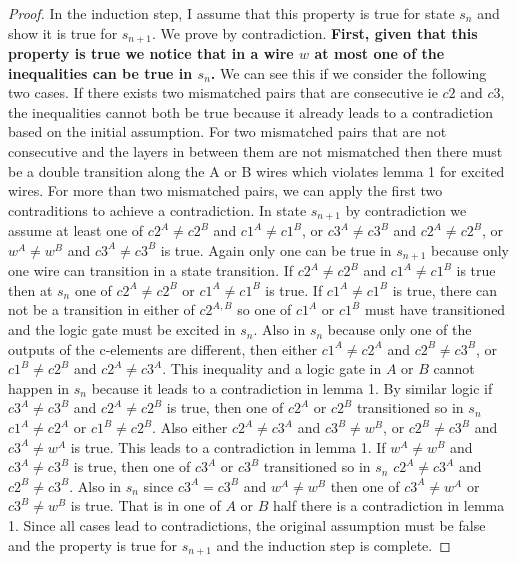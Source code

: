 \documentclass{article}
\begin{document}
\begin{proof}
In the induction step, I assume that this property is true for state $s_n$ and show it is true for $s_{n+1}$.  \newline
We prove by contradiction.  \textbf{First, given that this property is true we notice that in a wire $w$ at most one of the inequalities can be true in $s_n$.} We can see this if we consider the following two cases. If there exists two mismatched pairs that are consecutive ie $c2$ and $c3$, the inequalities cannot both be true because it already leads to a contradiction based on the initial assumption.  For two mismatched pairs that are not consecutive and the layers in between them are not mismatched then there must be a double transition along the A or B wires which violates lemma 1 for excited wires.  For more than two mismatched pairs, we can apply the first two contraditions to achieve a contradiction.\newline
In state $s_{n+1}$ by contradiction we assume at least one of $c2^A\neq c2^B$ and $c1^A\neq c1^B$, or $c3^A\neq c3^B$ and $c2^A\neq c2^B$, or $w^A\neq w^B$ and $c3^A\neq c3^B$ is true.  Again only one can be true in $s_{n+1}$ because only one wire can transition in a state transition.  If $c2^A\neq c2^B$ and $c1^A\neq c1^B$ is true then at $s_n$ one of $c2^A\neq c2^B$ or $c1^A\neq c1^B$ is true. If $c1^A\neq c1^B$ is true, there can not be a transition in either of $c2^{A,B}$ so one of $c1^A$ or $c1^B$ must have transitioned and the logic gate must be excited in $s_n$.  Also in $s_n$ because only one of the outputs of the c-elements are different, then either $c1^A\neq c2^A$ and $c2^B \neq c3^B$, or $c1^B\neq c2^B$ and $c2^A \neq c3^A$.  This inequality and a logic gate in $A$ or $B$ cannot happen in $s_n$ because it leads to a contradiction in lemma 1.
By similar logic if $c3^A\neq c3^B$ and $c2^A\neq c2^B$ is true, then one of $c2^A$ or $c2^B$ transitioned so in $s_n$ $c1^A \neq c2^A$ or $c1^B \neq c2^B$.  Also either $c2^A\neq c3^A$ and $c3^B \neq w^B$, or $c2^B\neq c3^B$ and $c3^A \neq w^A$ is true.  This leads to a contradiction in lemma 1.
If $w^A\neq w^B$ and $c3^A\neq c3^B$ is true, then one of $c3^A$ or $c3^B$ transitioned so in $s_n$ $c2^A \neq c3^A$ and $c2^B \neq c3^B$.  Also in $s_n$ since $c3^A = c3^B$ and $w^A\neq w^B$ then one of $c3^A \neq w^A$ or $c3^B \neq w^B$ is true.  That is in one of $A$ or $B$ half there is a contradiction in lemma 1.
Since all cases lead to contradictions, the original assumption must be false and the property is true for $s_{n+1}$ and the induction step is complete. \newline


\end{proof}
\end{document}

